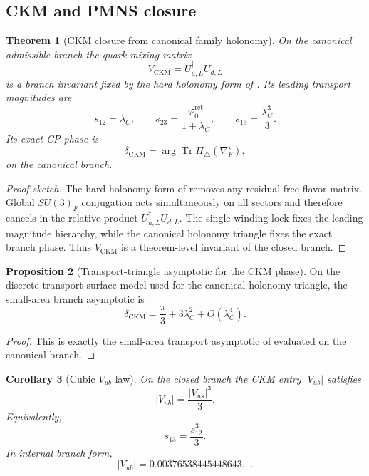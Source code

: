 \documentclass[11pt,a4paper]{article}
\newtheorem{theorem}{Theorem}[section]
\newtheorem{corollary}[theorem]{Corollary}
\theoremstyle{definition}
\newtheorem{proposition}[theorem]{Proposition}
\theoremstyle{remark}
\DeclareMathOperator{\tr}{Tr}
\newcommand{\phiz}{\varphi_0^{\mathrm{ret}}}
\begin{document}
\subsection{CKM and PMNS closure}

\begin{theorem}[CKM closure from canonical family holonomy]
\label{thm:ckm-closure}
On the canonical admissible branch the quark mixing matrix
\[
V_{\mathrm{CKM}}=U_{u,L}^\dagger U_{d,L}
\]
is a branch invariant fixed by the hard holonomy form of
. Its leading transport magnitudes are
\begin{equation}
\label{eq:ckm-magnitudes}
s_{12}=\lambda_C,
\qquad
s_{23}=\frac{\phiz}{1+\lambda_C},
\qquad
s_{13}=\frac{\lambda_C^3}{3}.
\end{equation}
Its exact CP phase is
\[
\delta_{\mathrm{CKM}}=\arg\tr\Pi_\triangle(\nabla_F^\star),
\]
on the canonical branch.
\end{theorem}

\begin{proof}[Proof sketch]
The hard holonomy form of  removes any residual free flavor
matrix. Global $SU(3)_F$ conjugation acts simultaneously on all sectors and therefore cancels in
the relative product $U_{u,L}^\dagger U_{d,L}$. The single-winding lock fixes the leading magnitude
hierarchy, while the canonical holonomy triangle fixes the exact branch phase. Thus
$V_{\mathrm{CKM}}$ is a theorem-level invariant of the closed branch.
\end{proof}

\begin{proposition}[Transport-triangle asymptotic for the CKM phase]
\label{prop:ckm-phase-asymptotic}
On the discrete transport-surface model used for the canonical holonomy triangle, the small-area
branch asymptotic is
\begin{equation}
\label{eq:ckm-phase}
\delta_{\mathrm{CKM}}=\frac{\pi}{3}+3\lambda_C^2+O(\lambda_C^4).
\end{equation}
\end{proposition}

\begin{proof}
This is exactly the small-area transport asymptotic of
 evaluated on the canonical branch.
\end{proof}

\begin{corollary}[Cubic \texorpdfstring{$V_{ub}$}{Vub} law]
\label{cor:cubic-vub-law}
On the closed branch the CKM entry $|V_{ub}|$ satisfies
\[
|V_{ub}|=\frac{|V_{us}|^3}{3}.
\]
Equivalently,
\[
s_{13}=\frac{s_{12}^3}{3}.
\]
In internal branch form,
\[
|V_{ub}|=0.00376538445448643\ldots.
\]
\end{corollary}
\end{document}
